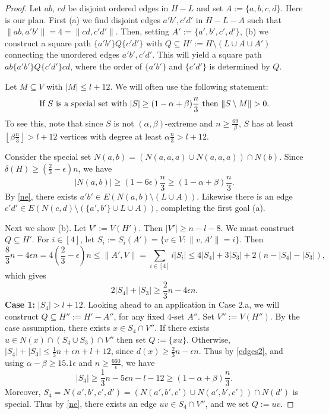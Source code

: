 \documentclass[oneside,12pt]{memoir}
\newcommand{\ep}{\epsilon}
\newcommand{\floor}[1]{\left\lfloor#1\right\rfloor}
\begin{document}
\begin{proof}

Let $ab$, $cd$ be disjoint ordered edges in $H-L$ and set $A:=\{a,b,c,d\}$.
Here is our plan. First (a) we find disjoint edges $a'b',c'd'$
in $H-L-A$ such that $\|ab,a'b'\|=4=\|cd,c'd'\|$. Then, setting $A':=\{a',b',c',d'\}$,
(b) we construct a square path $\{a'b'\}Q\{c'd'\}$ with $Q\subseteq H':=H\setminus(L\cup A\cup A')$
connecting the unordered edges $a'b',c'd'$. This will yield a square
path $ab\{a'b'\}Q\{c'd'\}cd$, where the order of $\{a'b'\}$ and $\{c'd'\}$
is determined by $Q$.

Let $M\subseteq V$ with $|M|\le l+12$. We will often use the following
statement: \begin{equation}
\textrm{If \ensuremath{S} is a special set with \ensuremath{|S|\ge(1-\alpha+\beta)\frac{n}{3}} then \ensuremath{\|S\setminus M\|>0}.}\label{ne}\end{equation}
To see this, note that since $S$ is not $(\alpha,\beta)$-extreme and $n\geq \frac{69}{\beta}$, $S$ has at least $\floor{\beta\frac{n}{3}}>l+12$ vertices with degree at least $\alpha\frac{n}{3}>l+12$.

Consider the special set $N(a,b)=(N(a,a,a)\cup N(a,a,a))\cap N(b)$.
Since $\delta(H)\geq(\frac{2}{3}-\ep)n$, we have \[
|N(a,b)|\geq(1-6\ep)\frac{n}{3}\geq(1-\alpha+\beta)\frac{n}{3}.\]
 By \eqref{ne}, there exists $a'b'\in E(N(a,b)\setminus(L\cup A))$.
Likewise there is an edge $c'd'\in E(N(c,d)\setminus(\{a',b'\}\cup L\cup A))$,
completing the first goal (a).

Next we show (b). Let $V':=V(H')$. Then $|V'|\ge n-l-8$. We must
construct $Q\subseteq H'$. For $i\in[4]$, let $S_{i}:=S_i(A')=\{v\in V:\|v,A'\|=i\}$.
Then 
\begin{equation}
\frac{8}{3}n-4\ep n=4(\frac{2}{3}-\ep)n\le\|A',V\|  =\sum_{i\in[4]}i|S_{i}|\le4|S_{4}|+3|S_{3}|+2(n-|S_{4}|-|S_{3}|),\label{edges1}
\end{equation}
which gives
\begin{equation}
2|S_{4}|+|S_{3}|\geq \frac{2}{3}n-4\ep n.\label{edges2}
\end{equation}
\textbf{Case 1:} $|S_{4}|>l+12$. Looking ahead to an application
in Case 2.a, we will construct $Q\subseteq H'':=H'-A''$, for any fixed
$4$-set $A''$. Set $V'':=V(H'')$. By the case assumption, there exists $x\in S_{4}\cap V''$.
If there exists $u\in N(x)\cap(S_{4}\cup S_{3})\cap V''$ then set
$Q:=\{xu\}$. Otherwise, $|S_{4}|+|S_{3}|\le\frac{1}{3}n+\ep n+l+12$,
since $d(x)\ge\frac{2}{3}n-\ep n$. Thus by \eqref{edges2}, and using
$\alpha-\beta\ge15.1\ep$ and $n\geq \frac{660}{\ep}$, we have \[
|S_{4}|\ge\frac{1}{3}n-5\ep n-l-12\ge(1-\alpha+\beta)\frac{n}{3}.\]
 Moreover, $S_{4}=N(a',b',c',d')=(N(a',b',c')\cup N(a',b',c'))\cap N(d')$
is special. Thus by \eqref{ne}, there exists an edge $uv\in S_{4}\cap V''$,
and we set $Q:=uv$.


\end{proof}
\end{document}

